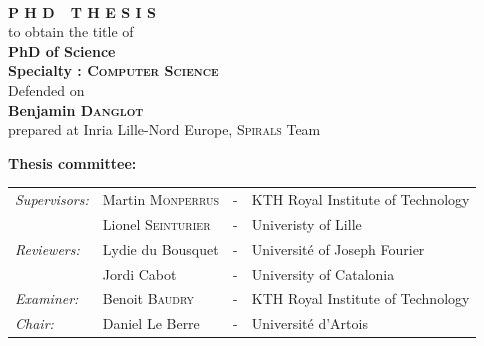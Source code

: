 \begin{titlepage}
\begin{center}
\vspace*{0.9cm}
 \\
\vspace*{0.9cm}
\vspace*{0.5cm}
\noindent \Huge \textbf{P H D\ \ T H E S I S} \\
\vspace*{0.3cm}
\noindent \large {to obtain the title of} \\
\vspace*{0.3cm}
\noindent \LARGE \textbf{PhD of Science} \\
\vspace*{0.3cm}
\noindent \Large \textbf{Specialty : \textsc{Computer Science}}\\
\vspace*{0.4cm}
\noindent \large {Defended on \\}
\noindent \LARGE \textbf{Benjamin \textsc{Danglot}} \\
\vspace*{0.9cm}
\noindent \Large prepared at Inria Lille-Nord Europe, \textsc{Spirals} Team\\
\vspace*{0.5cm}
\end{center}
\noindent \large \textbf{Thesis committee:} \\
\begin{center}
\noindent \large 
\begin{tabular}{llcl}
      \textit{Supervisors:}	& Martin \textsc{Monperrus}	& - & KTH Royal Institute of Technology \\
      & Lionel \textsc{Seinturier}	& - & Univeristy of Lille \\
      \textit{Reviewers:} & Lydie du Bousquet & - & Université of Joseph Fourier \\
      & Jordi Cabot & - & University of Catalonia \\
      \textit{Examiner:} & Benoit \textsc{Baudry} & - &  KTH Royal Institute of Technology\\
      \textit{Chair:} & Daniel Le Berre & - & Université d'Artois \\
\end{tabular}
\end{center}
\end{titlepage}
\sloppy

\titlepage

